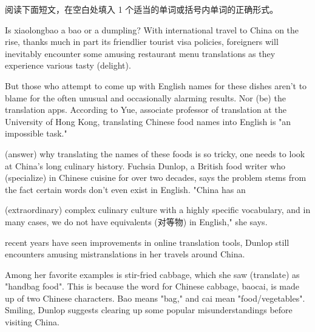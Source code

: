 \documentclass{英语试卷}
\begin{document}
\par 阅读下面短文，在空白处填入 1 个适当的单词或括号内单词的正确形式。\par
\par Is xiaolongbao a bao or a dumpling? With international travel to China on the rise, thanks much in part  its friendlier tourist visa policies, foreigners will inevitably encounter some amusing restaurant menu translations as they experience various tasty  (delight).\par
\par But those who attempt to come up with English names for these dishes aren't to blame for the often unusual and occasionally alarming results. Nor  (be) the translation apps. According to Yue,  associate professor of translation at the University of Hong Kong, translating Chinese food names into English is "an impossible task."\par
\par {} (answer) why translating the names of these foods is so tricky, one needs to look at China's long culinary history. Fuchsia Dunlop, a British food writer who  (specialize) in Chinese cuisine for over two decades, says the problem stems from the fact  certain words don't even exist in English. "China has an\par
\par {} (extraordinary) complex culinary culture with a highly specific vocabulary, and in many cases, we do not have equivalents (对等物) in English," she says.\par
\par {} recent years have seen improvements in online translation tools, Dunlop still encounters amusing mistranslations in her travels around China.\par
\par Among her favorite examples is stir-fried cabbage, which she saw  (translate) as "handbag food". This is because the word for Chinese cabbage, baocai, is made up of two Chinese characters. Bao means "bag," and cai mean "food/vegetables". Smiling, Dunlop suggests clearing up some popular misunderstandings before visiting China.\par
\end{document}
